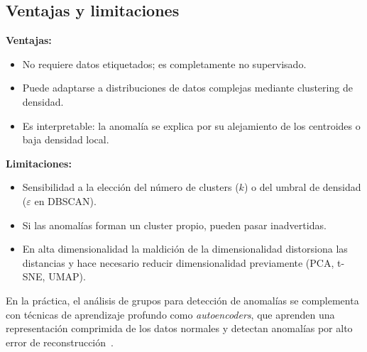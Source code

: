 \subsection{Ventajas y limitaciones}

\textbf{Ventajas:}
\begin{itemize}[leftmargin=2em]
    \item No requiere datos etiquetados; es completamente no supervisado.
    \item Puede adaptarse a distribuciones de datos complejas mediante clustering de densidad.
    \item Es interpretable: la anomalía se explica por su alejamiento de los centroides o baja densidad local.
\end{itemize}

\textbf{Limitaciones:}
\begin{itemize}[leftmargin=2em]
    \item Sensibilidad a la elección del número de clusters ($k$) o del umbral de densidad ($\varepsilon$ en DBSCAN).
    \item Si las anomalías forman un cluster propio, pueden pasar inadvertidas.
    \item En alta dimensionalidad la maldición de la dimensionalidad distorsiona las distancias y hace necesario reducir dimensionalidad previamente (PCA, t-SNE, UMAP).
\end{itemize}

En la práctica, el análisis de grupos para detección de anomalías se complementa con técnicas de aprendizaje profundo como \emph{autoencoders}, que aprenden una representación comprimida de los datos normales y detectan anomalías por alto error de reconstrucción~\cite{chalapathy2019deep}.
